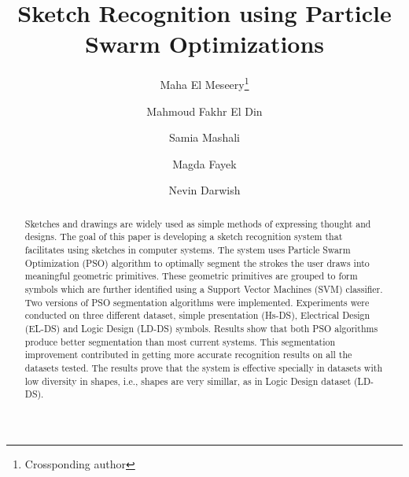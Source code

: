 \documentclass[preprint,10pt,5p,twocolumn]{elsarticle}
\begin{document}
\begin{frontmatter}
\title{Sketch Recognition using Particle Swarm Optimizations}


\author[ERI]{Maha El Meseery\footnote{Crossponding author}}
\author[ERI]{Mahmoud Fakhr El Din}
\author[ERI]{Samia Mashali}
\author[FAC]{Magda Fayek}
\author[FAC]{Nevin Darwish}
\address[ERI]{Signals Processing Group, Computers and Systems Department, 
  Electronic Research Institute, Cairo, Egypt\\melmeseery@eri.sci.eg, mafakhr@mcit.gov.eg, samia@eri.sci.eg}
\address[FAC]{Computer Engineering Department,
	Faculty of Engineering,Cairo University, Cairo, Egypt\\
	magdafayek@gmail.com,ndarwish@ieee.org}
\begin{abstract}
Sketches and drawings are widely used as simple methods of expressing thought and designs. The goal of this paper is developing a sketch recognition system that facilitates using sketches in computer systems. The system uses Particle Swarm Optimization (PSO) algorithm to optimally segment the strokes the user draws into meaningful geometric primitives.  These geometric primitives are grouped to form symbols which are further identified using a Support Vector Machines (SVM) classifier. Two versions of PSO segmentation algorithms were implemented. Experiments were conducted on three different dataset, simple presentation (Hs-DS), Electrical Design (EL-DS) and Logic Design (LD-DS) symbols. Results show that both PSO algorithms produce better segmentation than most current systems. This segmentation improvement contributed in getting more accurate recognition results on all the datasets tested. The results prove that the system is effective specially in datasets with low diversity in shapes, i.e., shapes are very simillar, as in Logic Design dataset (LD-DS). %


\end{abstract}
\end{frontmatter}
\end{document}
